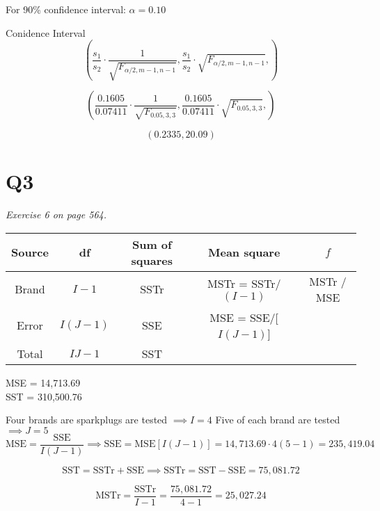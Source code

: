 \documentclass[a4paper,11pt]{article}
\begin{document}
For 90\% confidence interval: $\alpha = 0.10$\newline

Conidence Interval\\

\[ \left(  
  \frac{s_1}{s_2} \cdot \frac{1}{\sqrt{F_{\alpha/2,m-1,n-1}}} ,  
  \frac{s_1}{s_2} \cdot \sqrt{F_{\alpha/2,m-1,n-1}} ,
\right) \]\newline

\[ \left(  
  \frac{0.1605}{0.07411} \cdot \frac{1}{\sqrt{F_{0.05,3,3}}} ,  
  \frac{0.1605}{0.07411} \cdot \sqrt{F_{0.05,3,3}} ,
\right) \]\newline

\[(0.2335, 20.09)\]

\pagebreak

\section*{Q3}
\textit{Exercise 6 on page 564.}\newline

\begin{center}
  \begin{tabular}{ c c c c c }
    \hline
    \textbf{Source}  & \textbf{df} & \textbf{Sum of squares} & \textbf{Mean square}   & \textbf{$f$} \\ 
    \hline
    Brand            & $I - 1$     & SSTr                    & MSTr = SSTr/$(I - 1)$  & MSTr / MSE \\  
    Error            & $I(J - 1)$  & SSE                     & MSE = SSE/[$I(J - 1)$] \\
    Total            & $IJ - 1$    & SST \\
    \hline
  \end{tabular}
\end{center}

MSE = 14,713.69 \\
SST = 310,500.76 \newline

Four brands are sparkplugs are tested $\implies I = 4$\newline
Five of each brand are tested $\implies J = 5$
\[
  \text{MSE} = \frac{\text{SSE}}{I(J - 1)} 
  \implies
  \text{SSE} = \text{MSE}[I(J - 1)] = 14,713.69 \cdot 4 (5 - 1) = 235,419.04
\]

\[
  \text{SST} = \text{SSTr} + \text{SSE}
  \implies 
  \text{SSTr} = \text{SST} - \text{SSE} = 75,081.72 
\]

\[\text{MSTr} = \frac{\text{SSTr}}{I-1} = \frac{75,081.72}{4 - 1} = 25,027.24 \]
\end{document}
